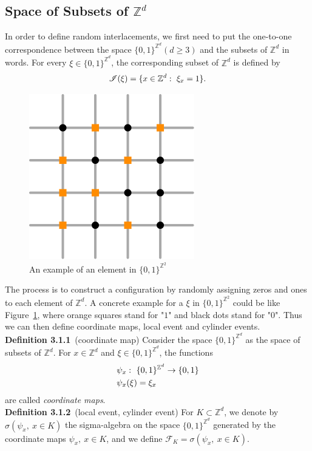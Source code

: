\documentclass[
11pt, %
a4paper, %
oneside, %
headinclude,footinclude, %
BCOR5mm, %
]{scrartcl}
\begin{document}
\subsection{Space of Subsets of $\mathbb{Z}^d$}
In order to define random interlacements, we first need to put the one-to-one correspondence between the space $\{0,1\}^{\mathbb{Z}^d}(d \geq 3)$ and the subsets of $\mathbb{Z}^d$ in words. For every $\xi \in \{0,1\}^{\mathbb{Z}^d}$, the corresponding subset of $\mathbb{Z}^d$ is defined by
\begin{equation}
    \mathscr{I}(\xi)=\{ x \in \mathbb{Z}^d: \ \xi_x=1 \}. \notag
\end{equation}
\begin{figure}[htb]
\centering 
\includegraphics[width=0.3\columnwidth]{Figures/coordinate map.png} 
\caption[coordinate map]{An example of an element in $\{0,1\}^{\mathbb{Z}^2}$} 
\label{coordinate map} 
\end{figure}
The process is to construct a configuration by randomly assigning zeros and ones to each element of $\mathbb{Z}^d$. A concrete example for a $\xi$ in $\{0,1\}^{\mathbb{Z}^2}$ could be like Figure~\ref{coordinate map}, where orange squares stand for "$1$" and black dots stand for "$0$". Thus we can then define coordinate maps, local event and cylinder events.
\vspace{0.6em}\\\textbf{Definition 3.1.1}\ (coordinate map) Consider the space $\{0,1\}^{\mathbb{Z}^d}$ as the space of subsets of $\mathbb{Z}^d$. For $x\in \mathbb{Z}^d$ and $\xi \in \{0,1\}^{\mathbb{Z}^d}$, the functions
\begin{align}
    &\psi_x: \ \{0,1\}^{\mathbb{Z}^d} \rightarrow \{0,1\} \notag \\
    &\psi_x(\xi)=\xi_x \notag
\end{align}
are called \textit{coordinate maps}.
\vspace{0.6em}\\\textbf{Definition 3.1.2}\ (local event, cylinder event) For $K \subset \mathbb{Z}^d$, we denote by $\sigma(\psi_x, \ x \in K)$ the sigma-algebra on the space $\{0,1\}^{\mathbb{Z}^d}$ generated by the coordinate maps $\psi_x, \ x \in K$, and we define $\mathscr{F}_K=\sigma(\psi_x, \ x \in K)$.
\end{document}
